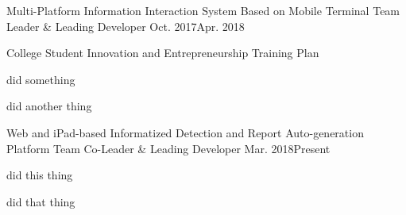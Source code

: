 
\begin{projitem}
    {Multi-Platform Information Interaction System Based on Mobile Terminal}
    {Team Leader \& Leading Developer}
    {Oct. 2017}{Apr. 2018}
    \item College Student Innovation and Entrepreneurship Training Plan
    \item did something
    \item did another thing
\end{projitem}

\begin{projitem}
    {Web and iPad-based Informatized Detection and Report Auto-generation Platform}
    {Team Co-Leader \& Leading Developer}
    {Mar. 2018}{Present}
    \item did this thing
    \item did that thing
\end{projitem}

\endinput